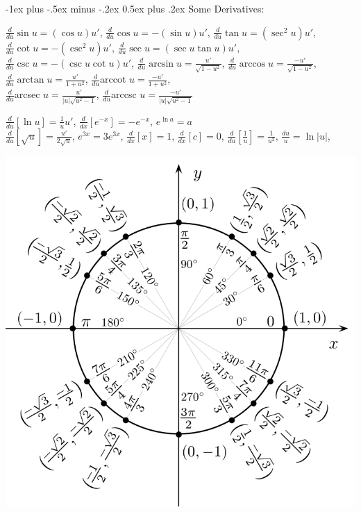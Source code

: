 \documentclass[10pt,landscape]{article}
\makeatletter
\renewcommand{\section}{\@startsection{section}{1}{0mm}%
                                {-1ex plus -.5ex minus -.2ex}%
                                {0.5ex plus .2ex}%
                                {\normalfont\large\bfseries}}
\makeatother
\begin{document}
\begin{multicols}{3}
\section{Some Derivatives:}

$\frac{d}{du} \sin u = (\cos u)u'$, $\frac{d}{du} \cos u = -(\sin u)u'$, $\frac{d}{du} \tan u = (\sec^2 u)u'$,
$\frac{d}{du} \cot u = -(\csc^2 u)u'$, $\frac{d}{du} \sec u = (\sec u \tan u)u'$, $\frac{d}{du} \csc u = -(\csc u \cot u)u'$,
$\frac{d}{du} \arcsin u = \frac{u'}{\sqrt{1 - u^2}}$, $\frac{d}{du} \arccos u = \frac{-u'}{\sqrt{1 - u^2}}$,
$\frac{d}{du} \arctan u = \frac{u'}{1 + u^2}$, $\frac{d}{du} $arccot $ u = \frac{-u'}{1 + u^2}$, \\
$\frac{d}{du} $arcsec $ u = \frac{u'}{|u|\sqrt{u^2 - 1}}$,
$\frac{d}{du} $arccsc $ u = \frac{-u'}{|u|\sqrt{u^2 - 1}}$

$\frac{d}{du}[\ln{u}] = \frac{1}{u}u'$, $\frac{d}{dx}[e^{-x}] = -e^{-x}$, $e^{\ln a} = a$ \\
$\frac{d}{du}[\sqrt{u}] = \frac{u'}{2 \sqrt{u}}$, $e^{3x} = 3e^{3x}$, $\frac{d}{dx}\left[ x \right] = 1$, $\frac{d}{dx}\left[ c \right] = 0$, 
$\frac{d}{du}[ \frac{1}{u} ] = \frac{1}{u^2}$, $\frac{du}{u} = \ln |u|$,


\includegraphics[width = \linewidth]{./img/unitCircle}






\end{multicols}
\end{document}
